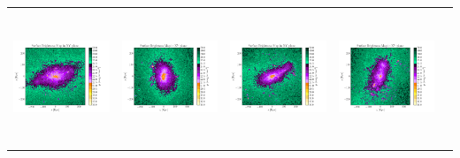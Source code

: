 \begin{tabular}{c c c c c}
 \hspace*{-1cm}\includegraphics[height=4cm,width=4cm,trim={2.5cm 1.5cm 5cm 1.5cm},clip]{../pngs/D10.png}  & 
 \hspace*{-.3cm}\includegraphics[height=4cm,width=4cm,trim={2.5cm 1.5cm 5cm 1.5cm},clip]{../pngs/D11.png}  & 
 \hspace*{-.3cm}\includegraphics[height=4cm,width=4cm,trim={2.5cm 1.5cm 5cm 1.5cm},clip]{../pngs/D12.png}  & 
 \hspace*{-.3cm}\includegraphics[height=4cm,width=4cm,trim={2.5cm 1.5cm 5cm 1.5cm},clip]{../pngs/D13.png}  &
 \\


\end{tabular}
